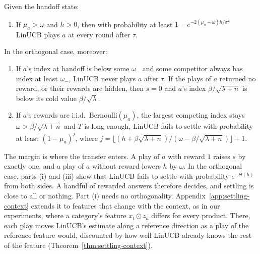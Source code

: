 \documentclass[anon]{alt2027} %
\newif\ifrevmarks\revmarkstrue
\newenvironment{revised}{\ifrevmarks\color{revcolor}\fi}{}
\newcommand{\rev}[1]{{\ifrevmarks\color{revcolor}\fi#1}}
\begin{document}
\begin{theorem}
\label{thm:settling}
Given the handoff state:
\begin{enumerate}[itemsep=1pt,topsep=1pt,leftmargin=*]
\item[(i)] If $\mu_a>\omega$ and $h>0$, then with probability at least
$1-e^{-2(\mu_a-\omega)h/\sigma^2}$ LinUCB plays $a$ at every round after
$\tau$.
\end{enumerate}
In the orthogonal case, moreover:
\begin{enumerate}[itemsep=1pt,topsep=1pt,leftmargin=*]
\item[(ii)] If $a$'s index at handoff is below some $\omega_-$ and some competitor
always has index at least $\omega_-$, LinUCB never plays $a$ after $\tau$.
\rev{If the plays of $a$ returned no reward, or their rewards are hidden, then
$s=0$ and $a$'s index $\beta/\sqrt{\lambda+n}$ is below its cold value
$\beta/\sqrt\lambda$.}
\item[(iii)] If $a$'s rewards are i.i.d.\ Bernoulli$(\mu_a)$, the largest competing
index stays $\omega>\beta/\sqrt{\lambda+n}$ and $T$ is long enough, LinUCB
fails to settle with probability at least $(1-\mu_a)^j$, where
$j=\bigl\lfloor(h+\beta\sqrt{\lambda+n})/(\omega-\beta/\sqrt{\lambda+n})\bigr\rfloor+1$.
\end{enumerate}
\end{theorem}

\begin{revised}
The margin is where the transfer enters. A play of $a$ with reward $1$
raises $s$ by exactly one, and a play of $a$ without reward lowers $h$ by
$\omega$. In the orthogonal case, parts (i) and (iii) show that LinUCB fails
to settle with probability $e^{-\Theta(h)}$ from both sides. A handful of
rewarded answers therefore decides, and settling is close to all or
nothing. Part (i) needs no orthogonality.
Appendix~\ref{app:settling-context} extends it to features that change with
the context, as in our experiments, where a category's feature $x_t\odot
z_a$ differs for every product. There, each play moves LinUCB's estimate
along a reference direction as a play of the reference feature would,
discounted by how well LinUCB already knows the rest of the feature
(Theorem~\ref{thm:settling-context}).
\end{revised}
\end{document}
